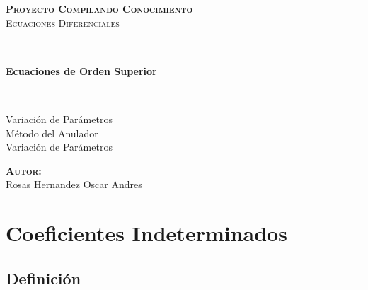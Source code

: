 \documentclass[12pt]{report}                               %
\author{Oscar Andrés Rosas}                                 %
\begin{document}
\begin{titlepage}

    \center
    \textbf{\textsc{\Large Proyecto Compilando Conocimiento}}\\[1.0cm] 
    \textsc{\Large Ecuaciones Diferenciales}\\[1.0cm] 

    \rule{\linewidth}{0.5mm} \\[1.0cm]
        { \huge \bfseries Ecuaciones de Orden Superior}\\[1.0cm] 
    \rule{\linewidth}{0.5mm} \\[2.0cm]
    
    {\LARGE Variación de Parámetros}\\[1cm] 
    {\LARGE Método del Anulador}\\[1cm] 
    {\LARGE Variación de Parámetros}\\[3cm] 
    
    \begin{center} \large
    \textbf{\textsc{Autor:}}\\
    Rosas Hernandez Oscar Andres
    \end{center}

    \vfill

\end{titlepage}


\tableofcontents{}
\clearpage

\chapter{Coeficientes Indeterminados}
    \clearpage

    \section{Definición}
\end{document}

